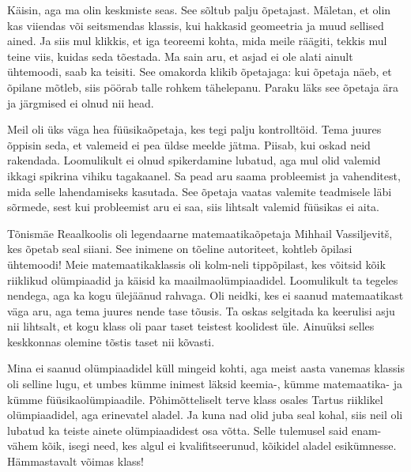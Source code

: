 Käisin, aga ma olin keskmiste seas. See sõltub palju õpetajast. 
Mäletan, et olin kas viiendas või seitsmendas klassis, kui hakkasid geomeetria ja muud sellised ained. Ja siis mul 
klikkis, et iga teoreemi kohta, mida meile räägiti, tekkis mul teine 
viis, kuidas seda tõestada. Ma sain aru, et asjad ei ole alati ainult 
ühtemoodi, saab ka teisiti. See omakorda klikib õpetajaga: kui 
õpetaja näeb, et õpilane mõtleb, siis pöörab talle rohkem tähelepanu. Paraku läks see õpetaja ära ja järgmised ei olnud nii head.

Meil oli üks väga hea füüsikaõpetaja, kes tegi palju kontrolltöid. 
Tema juures õppisin seda, et valemeid ei pea üldse meelde jätma. Piisab, kui oskad neid rakendada. Loomulikult ei olnud spikerdamine 
lubatud, aga mul olid valemid ikkagi spikrina vihiku tagakaanel. Sa pead 
aru saama probleemist ja vahenditest, mida selle 
lahendamiseks kasutada. See õpetaja vaatas valemite teadmisele läbi sõrmede, sest 
kui probleemist aru ei saa, siis lihtsalt valemid füüsikas ei aita. 

Tõnismäe Reaalkoolis oli legendaarne 
matemaatikaõpetaja Mihhail Vassiljevitš, kes õpetab seal
siiani. See inimene on tõeline autoriteet, kohtleb 
õpilasi ühtemoodi! Meie matemaatikaklassis oli kolm-neli tippõpilast, kes 
võitsid kõik riiklikud olümpiaadid ja käisid ka maailmaolümpiaadidel. Loomulikult ta 
tegeles nendega, aga ka kogu ülejäänud rahvaga. Oli neidki, 
kes ei saanud matemaatikast väga aru, aga tema juures nende tase tõusis. Ta oskas 
selgitada ka keerulisi asju nii lihtsalt, et kogu klass 
oli paar taset teistest koolidest üle. Ainuüksi selles  
keskkonnas olemine tõstis taset nii kõvasti.



Mina ei saanud olümpiaadidel küll mingeid kohti, aga 
meist aasta vanemas klassis oli selline lugu, et umbes kümme inimest läksid keemia-, kümme 
matemaatika- ja kümme füüsikaolümpiaadile. Põhimõtteliselt terve klass osales Tartus riiklikel
olümpiaadidel, aga erinevatel aladel. Ja kuna nad olid juba seal kohal, siis 
neil oli lubatud ka teiste ainete olümpiaadidest osa võtta. Selle tulemusel said enam-vähem kõik, isegi need, kes algul ei kvalifitseerunud,
kõikidel aladel esikümnesse. Hämmastavalt võimas klass!

